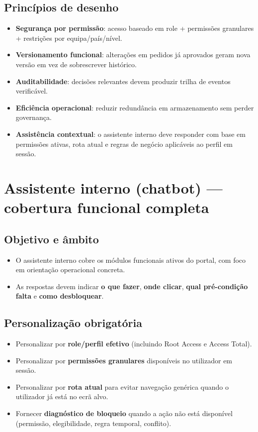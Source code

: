 \documentclass[11pt,a4paper]{article}
\begin{document}
\subsection{Princípios de desenho}
\begin{itemize}
  \item \textbf{Segurança por permissão}: acesso baseado em role + permissões granulares + restrições por equipa/país/nível.
  \item \textbf{Versionamento funcional}: alterações em pedidos já aprovados geram nova versão em vez de sobrescrever histórico.
  \item \textbf{Auditabilidade}: decisões relevantes devem produzir trilha de eventos verificável.
  \item \textbf{Eficiência operacional}: reduzir redundância em armazenamento sem perder governança.
  \item \textbf{Assistência contextual}: o assistente interno deve responder com base em permissões ativas, rota atual e regras de negócio aplicáveis ao perfil em sessão.
\end{itemize}

\section{Assistente interno (chatbot) — cobertura funcional completa}
\subsection{Objetivo e âmbito}
\begin{itemize}
  \item O assistente interno cobre os módulos funcionais ativos do portal, com foco em orientação operacional concreta.
  \item As respostas devem indicar \textbf{o que fazer}, \textbf{onde clicar}, \textbf{qual pré-condição falta} e \textbf{como desbloquear}.
\end{itemize}

\subsection{Personalização obrigatória}
\begin{itemize}
  \item Personalizar por \textbf{role/perfil efetivo} (incluindo Root Access e Access Total).
  \item Personalizar por \textbf{permissões granulares} disponíveis no utilizador em sessão.
  \item Personalizar por \textbf{rota atual} para evitar navegação genérica quando o utilizador já está no ecrã alvo.
  \item Fornecer \textbf{diagnóstico de bloqueio} quando a ação não está disponível (permissão, elegibilidade, regra temporal, conflito).
\end{itemize}
\end{document}
